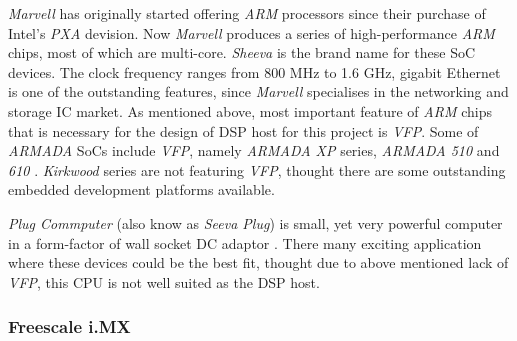   \emph{Marvell} has originally started offering \emph{ARM} processors
 since their purchase of Intel's \emph{PXA} devision. Now \emph{Marvell}
 produces a series of high-performance \emph{ARM} chips, most of which
 are multi-core. \emph{Sheeva} is the brand name for these SoC devices.
 The clock frequency ranges from 800 MHz to 1.6 GHz, gigabit Ethernet
 is one of the outstanding features, since \emph{Marvell} specialises
 in the networking and storage IC market. As mentioned above, most
 important feature of \emph{ARM} chips that is necessary for the design
 of DSP host for this project is \emph{VFP}. Some of \emph{ARMADA}
 SoCs include \emph{VFP}, namely \emph{ARMADA XP} series,
 \emph{ARMADA 510} and \emph{610} \cite{links:marvell:armada}.
 \emph{Kirkwood} series are not featuring \emph{VFP}, thought there
 are some outstanding embedded development platforms available.

  \emph{Plug Commputer} (also know as \emph{Seeva Plug}) is small, yet
 very powerful computer in a form-factor of wall socket DC adaptor
 \cite{links:marvell:plug,links:plugcomp:homepage}. There many exciting
 application where these devices could be the best fit, thought due to
 above mentioned lack of \emph{VFP}, this CPU is not well suited as the
 DSP host.


\subsubsection{Freescale i.MX}




